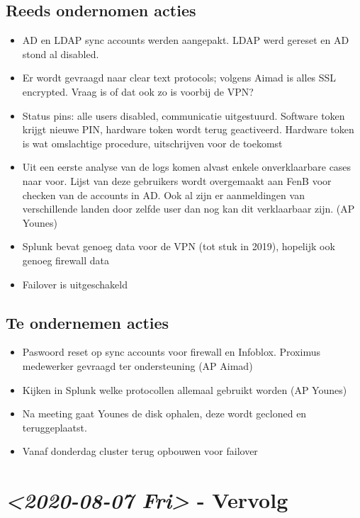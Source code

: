 \documentclass[11pt]{article}
\begin{document}
\subsection{Reeds ondernomen acties}
\label{sec:orgebeb768}
\begin{itemize}
\item AD en LDAP sync accounts werden aangepakt. LDAP werd gereset en AD stond al disabled.
\item Er wordt gevraagd naar clear text protocols; volgens Aimad is alles SSL encrypted. Vraag is of dat ook zo is voorbij de VPN?
\item Status pins: alle users disabled, communicatie uitgestuurd. Software token krijgt nieuwe PIN, hardware token wordt terug geactiveerd. Hardware token is wat omslachtige procedure, uitschrijven voor de toekomst
\item Uit een eerste analyse van de logs komen alvast enkele onverklaarbare cases naar voor. Lijst van deze gebruikers wordt overgemaakt aan FenB voor checken van de accounts in AD. Ook al zijn er aanmeldingen van verschillende landen door zelfde user dan nog kan dit verklaarbaar zijn. (AP Younes)
\item Splunk bevat genoeg data voor de VPN (tot stuk in 2019), hopelijk ook genoeg firewall data
\item Failover is uitgeschakeld
\end{itemize}

\subsection{Te ondernemen acties}
\label{sec:orgcea277a}
\begin{itemize}
\item Paswoord reset op sync accounts voor firewall en Infoblox. Proximus medewerker gevraagd ter ondersteuning (AP Aimad)
\item Kijken in Splunk welke protocollen allemaal gebruikt worden (AP Younes)
\item Na meeting gaat Younes de disk ophalen, deze wordt gecloned en teruggeplaatst.
\item Vanaf donderdag cluster terug opbouwen voor failover
\end{itemize}


\section{\textit{<2020-08-07 Fri> } - Vervolg}
\label{sec:org53c8ad9}
\end{document}
